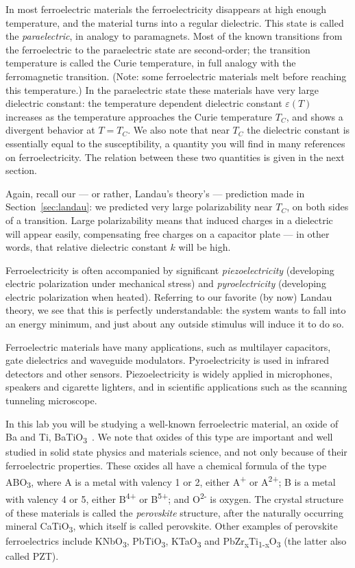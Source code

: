 \documentclass[11pt,a4paper]{article}
\newcommand{\BTO}{BaTiO\textsubscript{3}}
\begin{document}
In most ferroelectric materials the ferroelectricity disappears at high enough
temperature, and the material turns into a regular dielectric. This state is called
the \emph{paraelectric}, in analogy to paramagnets. Most of the known transitions from
the ferroelectric to the paraelectric state are second-order; the transition
temperature is called the Curie temperature, in full analogy with the ferromagnetic
transition. (Note: some ferroelectric materials melt before reaching this
temperature.) In the paraelectric state these materials have very large dielectric
constant: the temperature dependent dielectric constant $\varepsilon(T)$ increases
as the temperature approaches the Curie temperature $T_C$, and shows a divergent
behavior at $T = T_C$. We also note that near $T_C$ the dielectric constant is
essentially equal to the susceptibility, a quantity you will find in many references
on ferroelectricity. The relation between these two quantities is given in the next
section.

Again, recall our --- or rather, Landau's theory's --- prediction made in
Section~\ref{sec:landau}: we predicted very large polarizability near $T_C$, on both
sides of a transition. Large polarizability means that induced charges in a
dielectric will appear easily, compensating free charges on a capacitor plate ---
in other words, that relative dielectric constant $k$ will be high.

Ferroelectricity is often accompanied by significant \emph{piezoelectricity}
(developing electric polarization under mechanical stress) and
\emph{pyroelectricity} (developing electric polarization when heated). Referring to
our favorite (by now) Landau theory, we see that this is perfectly understandable:
the system wants to fall into an energy minimum, and just about any outside stimulus
will induce it to do so.

Ferroelectric materials have many applications, such as multilayer capacitors, gate
dielectrics and waveguide modulators. Pyroelectricity is used in infrared detectors
and other sensors. Piezoelectricity is widely applied in microphones, speakers and
cigarette lighters, and in scientific applications such as the scanning tunneling
microscope.

In this lab you will be studying a well-known ferroelectric material, an oxide of Ba
and Ti, \BTO~\cite{ref:jona,ref:blakemore,ref:doitpoms}. We note that oxides of this
type are important and well studied in solid state physics and materials science,
and not only because of their ferroelectric properties. These oxides all have a
chemical formula of the type ABO\textsubscript{3}, where A is a metal with valency 1
or 2, either A\textsuperscript{+} or A\textsuperscript{2+}; B is a metal with
valency 4 or 5, either B\textsuperscript{4+} or B\textsuperscript{5+}; and
O\textsuperscript{2-} is oxygen. The crystal structure of these materials is called
the \emph{perovskite} structure, after the naturally occurring mineral
CaTiO\textsubscript{3}, which itself is called perovskite. Other examples of
perovskite ferroelectrics include KNbO\textsubscript{3}, PbTiO\textsubscript{3},
KTaO\textsubscript{3} and
PbZr\textsubscript{x}Ti\textsubscript{1-x}O\textsubscript{3} (the latter also called
PZT).
\end{document}
